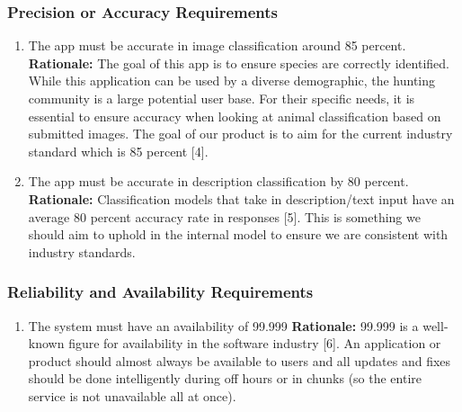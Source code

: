 \documentclass[]{article}
\begin{document}
\subsubsection{Precision or Accuracy Requirements}
\label{ssub:precision_or_accuracy_requirements}
\begin{enumerate}[{PR-PA}1. ]
	\item The app must be accurate in image classification around 85 percent.
	\newline \textbf{Rationale:} The goal of this app is to ensure species are correctly identified. While this application can be used by a diverse demographic, the hunting community is a large potential user base. For their specific needs, it is essential to ensure accuracy when looking at animal classification based on submitted images. The goal of our product is to aim for the current industry standard which is 85 percent [4]. 
	\item The app must be accurate in description classification by 80 percent. 
	\newline \textbf{Rationale:} Classification models that take in description/text input have an average 80 percent accuracy rate in responses [5]. This is something we should aim to uphold in the internal model to ensure we are consistent with industry standards. 
\end{enumerate}

\subsubsection{Reliability and Availability Requirements}
\label{ssub:reliability_and_availability_requirements}
\begin{enumerate}[{PR-RA}1. ]
	\item The system must have an availability of 99.999
	\newline \textbf{Rationale:} 99.999 is a well-known figure for availability in the software industry [6]. An application or product should almost always be available to users and all updates and fixes should be done intelligently during off hours or in chunks (so the entire service is not unavailable all at once). 
\end{enumerate}
\end{document}
